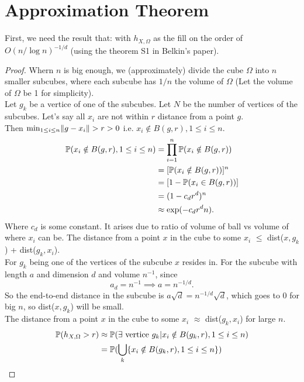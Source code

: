 \documentclass[twoside]{memoir}
\begin{document}
\section{Approximation Theorem} \label{sec:AppThm}
First, we need the result that: with $h_{X,\Omega}$ as the fill on the order of $O(n/\log n)^{-1/d}$ (using the theorem S1 in Belkin's paper).
\begin{proof}
	Whern $n$ is big enough, we (approximately) divide the cube $\Omega$ into $n$ smaller subcubes, where each subcube has $1/n$ the volume of $\Omega$ (Let the volume of $\Omega$ be 1 for simplicity).\\
	Let $g_k$ be a vertice of one of the subcubes. Let $N$ be the number of vertices of the subcubes.
	Let's say all $x_i$ are not within $r$ distance from a point $g$.\\ Then $\min_{1 \leq i \leq n} \lVert g - x_i\rVert > r > 0 $ i.e. 
	$x_i \notin B(g, r), 1\leq i\leq n$.
	\begin{equation*}
	\begin{split}
		\mathbb{P}(x_i \notin B(g, r), 1\leq i\leq n) &= \prod_{i=1}^{n} \mathbb{P}(x_i \notin B(g, r)) \\
		&= [\mathbb{P}(x_i \notin B(g, r))]^n \\
		&= [1 - \mathbb{P}(x_i \in B(g, r))] \\
		&= (1 - c_d r^d)^n \\
		&\approx \exp(-c_d r^d n). 
	\end{split}
	\end{equation*}
	Where $c_d$ is some constant. It arises due to ratio of volume of ball vs volume of where $x_i$ can be.
	The distance from a point $x$ in the cube to some $x_i$ $\leq$ dist($x, g_k$) + dist($g_k, x_i$).\\
	For $g_k$ being one of the vertices of the subcube $x$ resides in. For the subcube with length $a$ and dimension $d$ and volume $n^{-1}$, since 
	\[ a_d = n^{-1} \implies a = n^{-1/d}. \]
	So the end-to-end distance in the subcube is $a\sqrt{d} = n^{-1/d}\sqrt{d}$, which goes to 0 for big $n$, so dist($x, g_k$) will be small.\\
	 The distance from a point $x$ in the cube to some $x_i$ $\approx$ dist($g_k, x_i$) for large $n$.
	\begin{equation*}
	\begin{split}
		\PP(h_{X,\Omega} > r) &\approx \PP(\exists \text{ vertice } g_k | x_i \notin B(g_k, r), 1\leq i\leq n)\\
		&= \PP(\bigcup_{k} \{ x_i \notin B(g_k, r), 1 \leq i \leq n\} ) \\

\end{split}
\end{equation*}
\end{proof}
\end{document}
